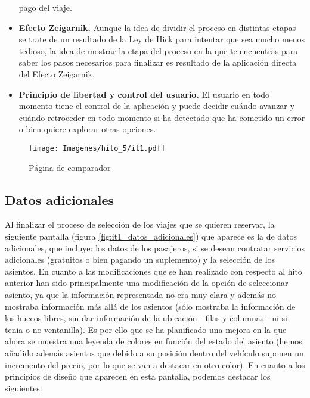 \begin{itemize}
        pago del viaje.
    \item \textbf{Efecto Zeigarnik.} Aunque la idea de dividir el proceso en distintas etapas se trate de un resultado de la
        Ley de Hick para intentar que sea mucho menos tedioso, la idea de mostrar la etapa del proceso en la que te
        encuentras para saber los pasos necesarios para finalizar es resultado de la aplicación directa del Efecto
        Zeigarnik.
    \item \textbf{Principio de libertad y control del usuario.} El usuario en todo momento tiene el control de la aplicación
        y puede decidir cuándo avanzar y cuándo retroceder en todo momento si ha detectado que ha cometido un error
        o bien quiere explorar otras opciones.
\end{itemize}

\begin{figure}[H]
    \centering
    \texttt{[image: Imagenes/hito\_5/it1.pdf]}
    \caption{Página de comparador}
    \label{fig:it1_comparador}
\end{figure}

\subsection*{Datos adicionales}

Al finalizar el proceso de selección de los viajes que se quieren reservar, la siguiente pantalla (figura \ref{fig:it1_datos_adicionales}) que aparece es
la de datos adicionales, que incluye: los datos de los pasajeros, si se desean contratar servicios
adicionales (gratuitos o bien pagando un suplemento) y la selección de los asientos. En cuanto a las modificaciones
que se han realizado con respecto al hito anterior han sido principalmente una modificación de la opción de seleccionar
asiento, ya que la información representada no era muy clara y además no mostraba información más allá de los asientos
(sólo mostraba la información de los huecos libres, sin dar información de la ubicación - filas y columnas - ni si
tenía o no ventanilla). Es por ello que se ha planificado una mejora en la que ahora se muestra una leyenda de
colores en función del estado del asiento (hemos añadido además asientos que debido a su posición dentro del vehículo
suponen un incremento del precio, por lo que se van a destacar en otro color). En cuanto a los principios de diseño que
aparecen en esta pantalla, podemos destacar los siguientes:

